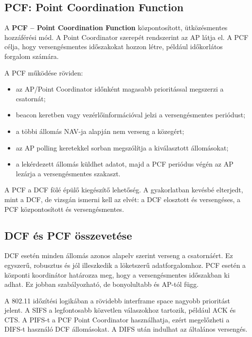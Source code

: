 \subsection{PCF: Point Coordination Function}

A \textbf{PCF -- Point Coordination Function} központosított, ütközésmentes hozzáférési mód. A Point Coordinator szerepét rendszerint az AP látja el. A PCF célja, hogy versengésmentes időszakokat hozzon létre, például időkorlátos forgalom számára.

A PCF működése röviden:

\begin{itemize}
  \item az AP/Point Coordinator időnként magasabb prioritással megszerzi a csatornát;
  \item beacon keretben vagy vezérlőinformációval jelzi a versengésmentes periódust;
  \item a többi állomás NAV-ja alapján nem verseng a közegért;
  \item az AP polling keretekkel sorban megszólítja a kiválasztott állomásokat;
  \item a lekérdezett állomás küldhet adatot, majd a PCF periódus végén az AP lezárja a versengésmentes szakaszt.
\end{itemize}

A PCF a DCF fölé épülő kiegészítő lehetőség. A gyakorlatban kevésbé elterjedt, mint a DCF, de vizsgán ismerni kell az elvét: a DCF elosztott és versengéses, a PCF központosított és versengésmentes.

\begin{center}

\end{center}

\subsection{DCF és PCF összevetése}

DCF esetén minden állomás azonos alapelv szerint verseng a csatornáért. Ez egyszerű, robusztus és jól illeszkedik a löketszerű adatforgalomhoz. PCF esetén a központi koordinátor határozza meg, hogy a versengésmentes időszakban ki adhat. Ez jobban szabályozható, de bonyolultabb és AP-tól függ.

A 802.11 időzítési logikában a rövidebb interframe space nagyobb prioritást jelent. A SIFS a legfontosabb közvetlen válaszokhoz tartozik, például ACK és CTS. A PIFS-t a PCF Point Coordinator használhatja, ezért megelőzheti a DIFS-t használó DCF állomásokat. A DIFS után indulhat az általános versengés.

